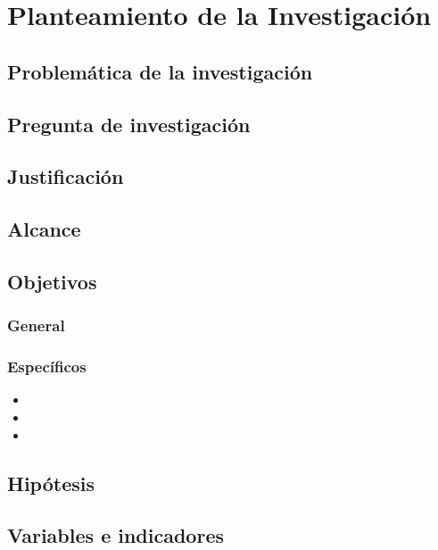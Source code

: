 \chapter{Planteamiento de la Investigación}
\renewcommand{\figurename}{Figura}

\section{Problemática de la investigación}



\section{Pregunta de investigación}



\section{Justificación}


\section{Alcance}


\section{Objetivos}

\subsection{General}


\subsection{Específicos}

\begin{itemize}
 \item 
\item 
\item 

\end{itemize}

\section{Hipótesis}



\section{Variables e indicadores}

